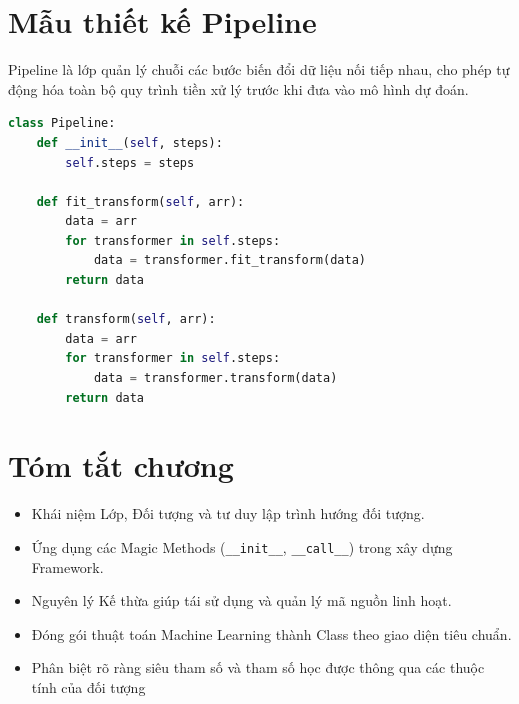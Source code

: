\section{Mẫu thiết kế Pipeline}

Pipeline là lớp quản lý chuỗi các bước biến đổi dữ liệu nối tiếp nhau, cho phép tự động hóa toàn bộ quy trình tiền xử lý trước khi đưa vào mô hình dự đoán.

\begin{lstlisting}[caption={Triển khai cấu trúc Pipeline cơ bản}, language=Python]
class Pipeline:
    def __init__(self, steps):
        self.steps = steps

    def fit_transform(self, arr):
        data = arr
        for transformer in self.steps:
            data = transformer.fit_transform(data)
        return data

    def transform(self, arr):
        data = arr
        for transformer in self.steps:
            data = transformer.transform(data)
        return data
\end{lstlisting}

\section{Tóm tắt chương}

\begin{itemize}
    \item Khái niệm Lớp, Đối tượng và tư duy lập trình hướng đối tượng.
    \item Ứng dụng các Magic Methods (\texttt{\_\_init\_\_}, \texttt{\_\_call\_\_}) trong xây dựng Framework.
    \item Nguyên lý Kế thừa giúp tái sử dụng và quản lý mã nguồn linh hoạt.
    \item Đóng gói thuật toán Machine Learning thành Class theo giao diện tiêu chuẩn.
    \item Phân biệt rõ ràng siêu tham số và tham số học được thông qua các thuộc tính của đối tượng
\end{itemize}